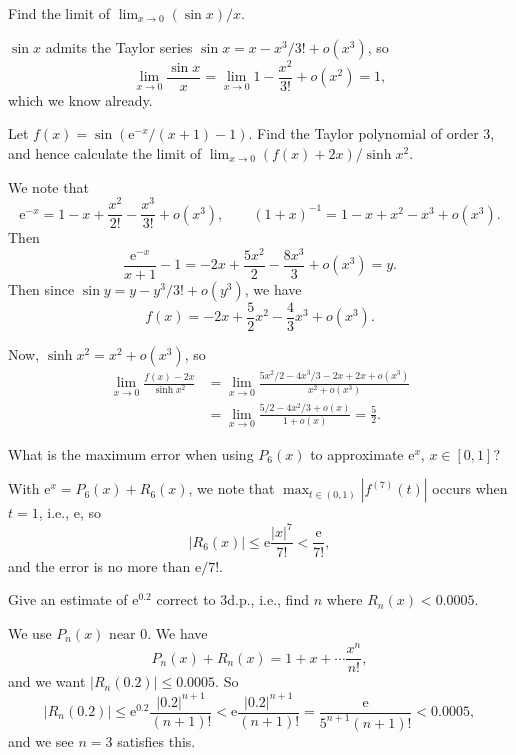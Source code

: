 \documentclass[letter-paper]{tufte-book}
\newenvironment{example}[1][Example]{\begin{trivlist}
\item[\hskip \labelsep {\bfseries #1}]}{\end{trivlist}}
\newcommand{\ex}{\mathrm{e}}
\begin{document}
\begin{example}
  Find the limit of $\lim_{x\to 0} (\sin x)/x$.
  
  $\sin x$ admits the Taylor series $\sin x=x-x^3/3! + o(x^3)$, so
  \begin{equation*}
    \lim_{x\to 0}\frac{\sin x}{x}=\lim_{x\to 0}1-\frac{x^2}{3!}+o(x^2)=1,
  \end{equation*}
  which we know already.
\end{example}
\begin{example}
  Let $f(x)=\sin(\ex^{-x}/(x+1)-1)$. Find the Taylor polynomial of order $3$,
  and hence calculate the limit of $\lim_{x\to 0} (f(x)+2x)/\sinh x^2$.
  
  We note that
  \begin{equation*}
    \ex^{-x}=1-x+\frac{x^2}{2!}-\frac{x^3}{3!}+o(x^3),\qquad
    (1+x)^{-1}=1-x+x^2-x^3+o(x^3).
  \end{equation*}
  Then
  \begin{equation*}
    \frac{\ex^{-x}}{x+1}-1=-2x+\frac{5x^2}{2}-\frac{8x^3}{3}+o(x^3)=y.
  \end{equation*}
  Then since $\sin y=y-y^3/3!+o(y^3)$, we have
  \begin{equation*}
    f(x)=-2x+\frac{5}{2}x^2-\frac{4}{3}x^3+o(x^3).
  \end{equation*}
  
  Now, $\sinh x^2=x^2+o(x^3)$, so
  \begin{align*}
    \lim_{x\to 0}\frac{f(x)-2x}{\sinh x^2} &= \lim_{x\to 0}\frac{5x^2/2-4x^3/3-2x+2x+o(x^3)}{x^2+o(x^3)} \\
    &= \lim_{x\to 0}\frac{5/2-4x^2/3+o(x)}{1+o(x)}=\frac{5}{2}.
  \end{align*}
\end{example}

\begin{example}
  What is the maximum error when using $P_6(x)$ to approximate $\ex^x$,
  $x\in[0,1]$?
  
  With $\ex^x=P_6(x)+R_6(x)$, we note that $\max_{t\in(0,1)}|f^{(7)}(t)|$ occurs
  when $t=1$, i.e., $\ex$, so
  \begin{equation*}
    |R_6(x)|\leq\ex\frac{|x|^7}{7!}<\frac{\ex}{7!},
  \end{equation*}
  and the error is no more than $\ex/7!$.
\end{example}

\begin{example}
  Give an estimate of $\ex^{0.2}$ correct to 3d.p., i.e., find $n$ where
  $R_n(x)<0.0005$.
  
  We use $P_n(x)$ near $0$. We have
  \begin{equation*}
    P_n(x)+R_n(x)=1+x+\cdots\frac{x^n}{n!},
  \end{equation*}
  and we want $|R_n(0.2)|\leq 0.0005$. So
  \begin{equation*}
    |R_n(0.2)|\leq\ex^{0.2}\frac{|0.2|^{n+1}}{(n+1)!}<
    \ex\frac{|0.2|^{n+1}}{(n+1)!}=\frac{\ex}{5^{n+1}(n+1)!}<0.0005,
  \end{equation*}
  and we see $n=3$ satisfies this.
\end{example}
\end{document}
